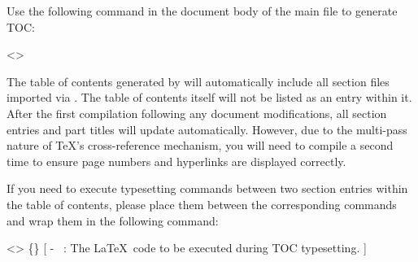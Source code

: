 
Use the following command in the document body of the main file to generate TOC:

<>{
}

The table of contents generated by  will automatically include all section files imported via . The table of contents itself will not be listed as an entry within it. After the first compilation following any document modifications, all section entries and part titles will update automatically. However, due to the multi-pass nature of \TeX's cross-reference mechanism, you will need to compile a second time to ensure page numbers and hyperlinks are displayed correctly.

If you need to execute typesetting commands between two section entries within the table of contents, please place them between the corresponding  commands and wrap them in the following command:

<>{
    \{\longarg\}
}[
    - \longarg\ : The \LaTeX\ code to be executed during TOC typesetting.
]


\newpage
